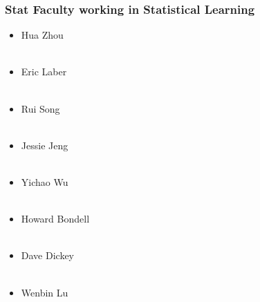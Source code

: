 \documentclass[hide notes,red,handout]{beamer}
\begin{document}
\begin{frame}[t]
\frametitle{Stat Faculty working in Statistical Learning}
\begin{itemize}
\item Hua Zhou\\~\\
\item Eric Laber\\~\\
\item Rui Song\\~\\
\item Jessie Jeng\\~\\
\item Yichao Wu\\~\\
\item Howard Bondell\\~\\
\item Dave Dickey\\~\\
\item Wenbin Lu\\~\\
\end{itemize}
\end{frame}
\end{document}
